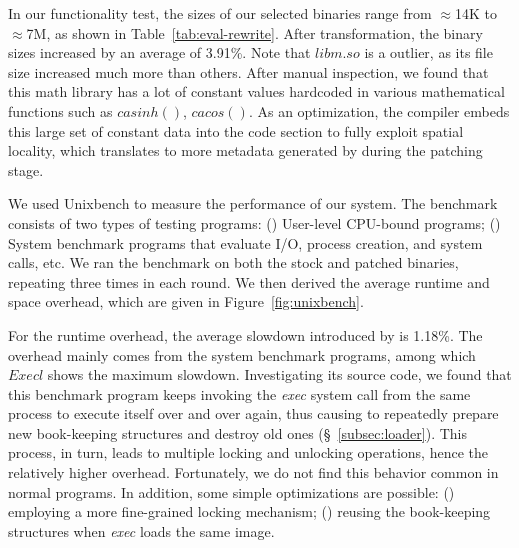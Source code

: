 
In our functionality test, the sizes of our selected binaries range from $\approx$14K to $\approx$7M,
as shown in Table~\ref{tab:eval-rewrite}. After transformation, the
binary sizes increased by an average of 3.91\%.  Note that $libm.so$
is a outlier, as its file size increased much more
than others. After manual inspection, we found that this math library has a lot of constant values
hardcoded in various mathematical functions such as $casinh()$,
$cacos()$. As an optimization,  the compiler embeds this large set of constant data into the code section to
fully exploit spatial locality, which translates to more metadata generated by \NORAX during the patching stage. 


We used Unixbench\cite{unixbench} to measure the performance of our system. 
The benchmark consists of two types of testing programs: () User-level CPU-bound programs; () System benchmark programs that evaluate I/O, process creation, and system calls, etc. We ran the benchmark on both the stock and patched binaries, repeating three times in each round. We then derived the average runtime and space overhead, which are given in Figure~\ref{fig:unixbench}.

For the runtime overhead, the average slowdown introduced by \NORAX is 1.18\%. The overhead mainly comes from the system benchmark programs, among which $Execl$ shows the maximum slowdown. Investigating its source code, we found that this benchmark program keeps invoking the \emph{exec} system call from the same process to execute itself over and over again, thus causing \NLoader to repeatedly prepare new book-keeping structures and destroy old ones (\S~\ref{subsec:loader}). This process, in turn, leads to multiple locking and unlocking operations, hence the relatively higher overhead. Fortunately, we do not find this behavior common in normal programs. In addition, some simple optimizations are possible: () employing a more fine-grained locking mechanism; () reusing the book-keeping structures when \emph{exec} loads the same image.

   
